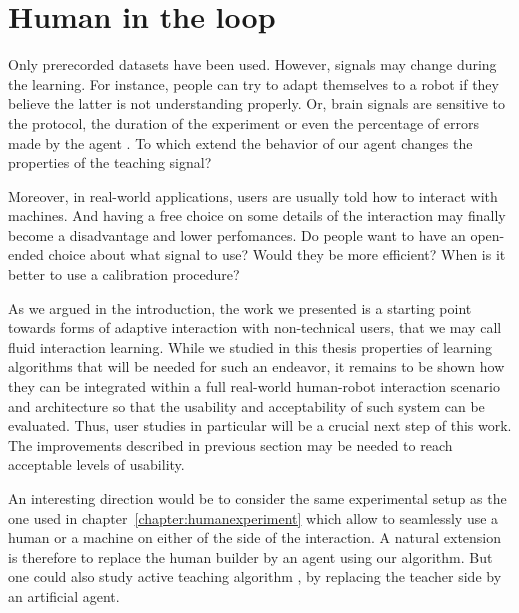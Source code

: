 
\section{Human in the loop}
\label{chapter:limitations:userstudies}


Only prerecorded datasets have been used. However, signals may change during the learning. For instance, people can try to adapt themselves to a robot if they believe the latter is not understanding properly. Or, brain signals are sensitive to the protocol, the duration of the experiment or even the percentage of errors made by the agent \cite{chavarriaga2010learning}. To which extend the behavior of our agent changes the properties of the teaching signal? 

Moreover, in real-world applications, users are usually told how to interact with machines. And having a free choice on some details of the interaction may finally become a disadvantage and lower perfomances. Do people want to have an open-ended choice about what signal to use? Would they be more efficient? When is it better to use a calibration procedure?

As we argued in the introduction, the work we presented is a starting point towards forms of adaptive interaction with non-technical users, that we may call fluid interaction learning. While we studied in this thesis properties of learning algorithms that will be needed for such an endeavor, it remains to be shown how they can be integrated within a full real-world human-robot interaction scenario and architecture so that the usability and acceptability of such system can be evaluated. Thus, user studies in particular will be a crucial next step of this work. The improvements described in previous section may be needed to reach acceptable levels of usability.

An interesting direction would be to consider the same experimental setup as the one used in chapter~\ref{chapter:humanexperiment} which allow to seamlessly use a human or a machine on either of the side of the interaction. A natural extension is therefore to replace the human builder by an agent using our algorithm. But one could also study active teaching algorithm \cite{cakmak2012algorithmic}, by replacing the teacher side by an artificial agent.


